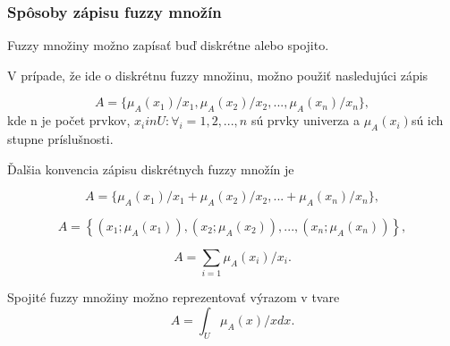 \subsubsection{Spôsoby zápisu fuzzy množín}
Fuzzy množiny možno zapísať buď diskrétne alebo spojito.

V prípade, že ide o diskrétnu fuzzy množinu, možno použiť nasledujúci zápis \cite{gregorref1, gregorUI}

\begin{equation}\label{disk0}
A = \{\mu_A(x_1)/x_1, \mu_A(x_2)/x_2, ... , \mu_A(x_n)/x_n\}, 
\end{equation}
kde n je počet prvkov, $x_i in U : \forall_i = 1, 2, ..., n$ sú prvky univerza a $\mu_A(x_i)$sú ich stupne príslušnosti.

Ďalšia konvencia zápisu diskrétnych fuzzy množín je  \cite{gregorUI} 

\begin{equation}\label{disk1}
A = \{\mu_A(x_1)/x_1 + \mu_A(x_2)/x_2, ...  + \mu_A(x_n)/x_n\}, 
\end{equation}

\begin{equation}\label{disk2}
A = \left\lbrace 
\left( x_1; \mu_A\left( x_1\right)  \right) , 
\left( x_2; \mu_A\left( x_2\right)  \right) , ... , 
\left( x_n; \mu_A\left( x_n\right)  \right) 
\right\rbrace , 
\end{equation}

\begin{equation}\label{disk3}
A = 
\sum\limits_{i=1} \mu_A(x_i)/x_i . 
\end{equation}

Spojité fuzzy množiny možno reprezentovať výrazom v tvare \cite{gregorref1}
\begin{equation}\label{disk4}
A = \int_{U}^{}  \mu_A(x)/xdx . 
\end{equation}
